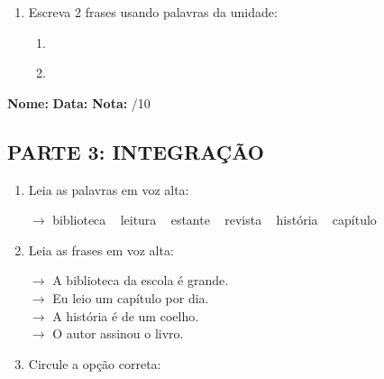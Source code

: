 \begin{exercicio}
\begin{enumerate}[resume]
  \item Escreva 2 frases usando palavras da unidade:
  \begin{enumerate}[label=\alph*)]
    \item \underline{\hspace{8cm}}
    \item \underline{\hspace{8cm}}
  \end{enumerate}

\end{enumerate}

\end{exercicio}



\begin{exercicio}

\noindent\textbf{Nome:} \underline{\hspace{3.2cm}} \quad \textbf{Data:} \underline{\hspace{1.6cm}} \quad \textbf{Nota:} \underline{\hspace{0.9cm}}/10


\subsection*{PARTE 3: INTEGRAÇÃO}

\begin{enumerate}[resume]

  \item Leia as palavras em voz alta:
  \begin{center}
  $\rightarrow$ biblioteca ~ leitura ~ estante ~ revista ~ história ~ capítulo
  \end{center}

  \item Leia as frases em voz alta:
  \begin{center}
  $\rightarrow$ A biblioteca da escola é grande.\\
  $\rightarrow$ Eu leio um capítulo por dia.\\
  $\rightarrow$ A história é de um coelho.\\
  $\rightarrow$ O autor assinou o livro.\\
  \end{center}

  \item Circule a opção correta:
  \begin{enumerate}[label=(\alph*)]


\end{enumerate}
\end{enumerate}
\end{exercicio}
